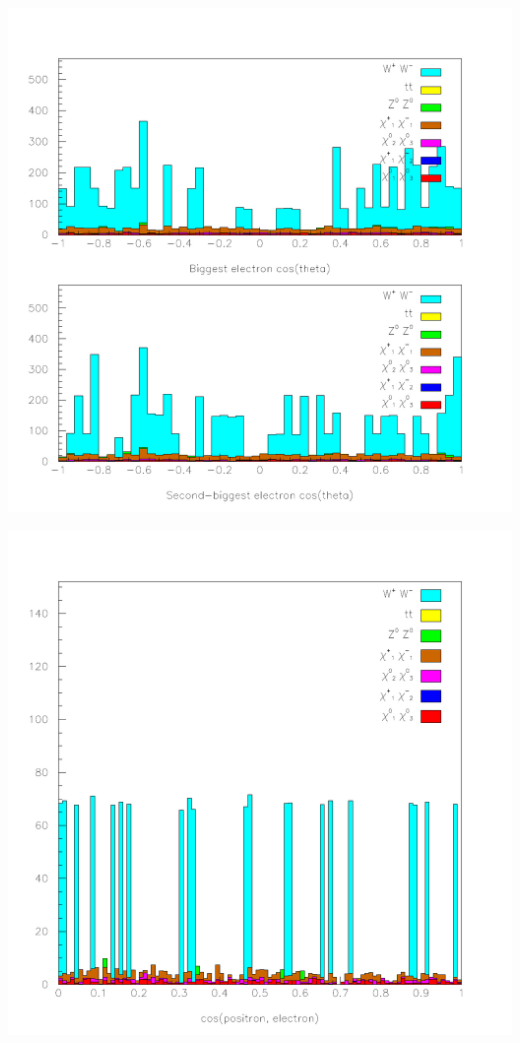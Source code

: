 \documentclass[landscape]{article}
\begin{document}
\begin{center} \includegraphics[height=\textheight]{pretty_5.pdf} \end{center}
\pagebreak

\begin{center} \includegraphics[height=\textheight]{pretty_6.pdf} \end{center}
\pagebreak
\end{document}
